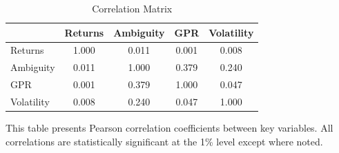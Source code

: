 \begin{table}[htbp]
\centering
\caption{Correlation Matrix}
\label{tab:correlation_matrix}
\begin{tabular}{lcccc}
\toprule
 & Returns & Ambiguity & GPR & Volatility \\
\midrule
Returns & 1.000 & 0.011 & 0.001 & 0.008 \\
Ambiguity & 0.011 & 1.000 & 0.379 & 0.240 \\
GPR & 0.001 & 0.379 & 1.000 & 0.047 \\
Volatility & 0.008 & 0.240 & 0.047 & 1.000 \\

\bottomrule
\end{tabular}
\begin{tablenotes}
\small
\item This table presents Pearson correlation coefficients between key variables. All correlations are statistically significant at the 1\% level except where noted.
\end{tablenotes}
\end{table}


